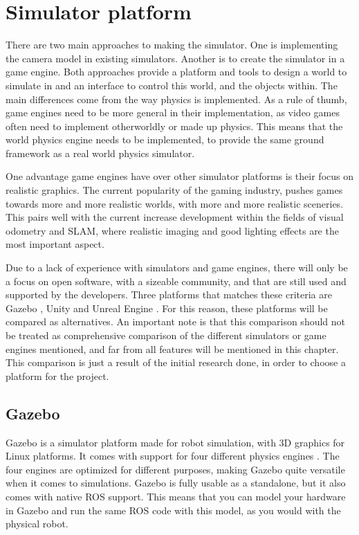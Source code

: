 
\chapter{Simulator platform}

There are two main approaches to making the simulator. One is implementing the camera model in existing simulators. Another is to create the simulator in a game engine. Both approaches provide a platform and tools to design a world to simulate in and an interface to control this world, and the objects within. The main differences come from the way physics is implemented. As a rule of thumb, game engines need to be more general in their implementation, as video games often need to implement otherworldly or made up physics. This means that the world physics engine needs to be implemented, to provide the same ground framework as a real world physics simulator. 

One advantage game engines have over other simulator platforms is their focus on realistic graphics. The current popularity of the gaming industry, pushes games towards more and more realistic worlds, with more and more realistic sceneries. This pairs well with the current increase development within the fields of visual odometry and SLAM, where realistic imaging and good lighting effects are the most important aspect.

Due to a lack of experience with simulators and game engines, there will only be a focus on open software, with a sizeable community, and that are still used and supported by the developers. Three platforms that matches these criteria are Gazebo \cite{Gazeboweb, GazeboPaper}, Unity \cite{Unityweb} and Unreal Engine \cite{Unrealweb}. For this reason, these platforms will be compared as alternatives. An important note is that this comparison should not be treated as comprehensive comparison of the different simulators or game engines mentioned, and far from all features will be mentioned in this chapter. This comparison is just a result of the initial research done, in order to choose a platform for the project.

\section{Gazebo}

Gazebo is a simulator platform made for robot simulation, with 3D graphics for Linux platforms. It comes with support for four different physics engines \cite{Gazebo_phys}. The four engines are optimized for different purposes, making Gazebo quite versatile when it comes to simulations. Gazebo is fully usable as a standalone, but it also comes with native ROS support. This means that you can model your hardware in Gazebo and run the same ROS code with this model, as you would with the physical robot.

